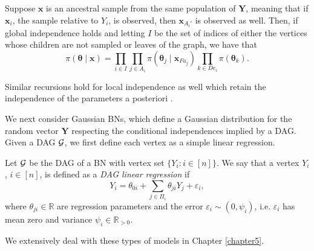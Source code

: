 \begin{proposition}
\label{prop:ancupd}
Suppose $\bm{x}$ is an ancestral sample from the same population of $\bm{Y}$, meaning that if $\bm{x}_i$, the sample relative to $Y_i$, is observed, then $\bm{x}_{A_i'}$ is observed as well. Then, if global independence holds and letting $I$ be the set of indices of either the vertices whose children are not sampled or leaves of the graph, we have that
\begin{equation}
\label{basta2}
\pi(\bm{\theta}\;|\;\bm{x})=\prod_{i\in I}\prod_{j\in A_i}\pi(\bm{\theta}_j\;|\;\bm{x}_{Fa_j})\prod_{k\in De_i}\pi(\bm{\theta}_k).
\end{equation}
\end{proposition}
Similar recursions hold for local independence as well which retain the independence of the parameters a posteriori \citep[see][]{Spiegelhalter1990,Smith2010}.

We next consider  Gaussian BNs, which define a Gaussian distribution for the random vector $\bm{Y}$ respecting the conditional independences implied by a DAG. Given a DAG $\mathcal{G}$, we first define each vertex as a simple linear  regression. 

\begin{definition}
\label{def:linreg}
Let $\mathcal{G}$ be the DAG of a BN with vertex set $\{Y_i:i\in[n]\}$. We say that a vertex $Y_i$, $i\in[n]$, is defined as a \emph{DAG linear regression} if
\begin{equation}
\label{eq:GausBN}
Y_i=\theta_{0i}+\sum_{j\in \Pi_i} \theta_{ji}Y_j+\varepsilon_i, 
\end{equation} 
where $\theta_{ji}\in\mathbb{R}$ are regression parameters and the error $\varepsilon_i\sim (0,\psi_i)$, i.e. $\varepsilon_i$  has mean zero and variance $\psi_i\in\mathbb{R}_{>0}$. 
\end{definition}

We extensively deal with these types of models in Chapter \ref{chapter5}.

